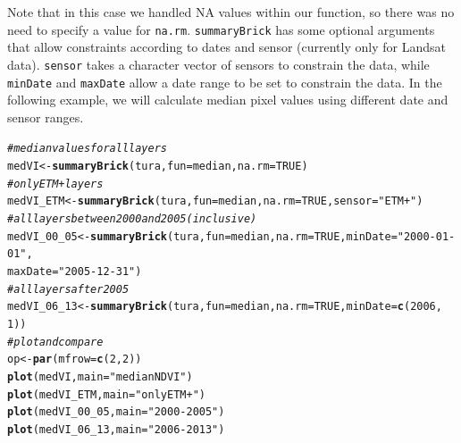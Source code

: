 \documentclass{article}\usepackage[]{graphicx}\usepackage[]{color}
\makeatletter
\newcommand{\hlnum}[1]{\textcolor[rgb]{0.686,0.059,0.569}{#1}}%
\newcommand{\hlstr}[1]{\textcolor[rgb]{0.192,0.494,0.8}{#1}}%
\newcommand{\hlcom}[1]{\textcolor[rgb]{0.678,0.584,0.686}{\textit{#1}}}%
\newcommand{\hlstd}[1]{\textcolor[rgb]{0.345,0.345,0.345}{#1}}%
\newcommand{\hlkwb}[1]{\textcolor[rgb]{0.69,0.353,0.396}{#1}}%
\newcommand{\hlkwc}[1]{\textcolor[rgb]{0.333,0.667,0.333}{#1}}%
\newcommand{\hlkwd}[1]{\textcolor[rgb]{0.737,0.353,0.396}{\textbf{#1}}}%
\newenvironment{kframe}{%
 \def\at@end@of@kframe{}%
 \ifinner\ifhmode%
  \def\at@end@of@kframe{\end{minipage}}%
  \begin{minipage}{\columnwidth}%
 \fi\fi%
 \def\FrameCommand##1{\hskip\@totalleftmargin \hskip-\fboxsep
 \colorbox{shadecolor}{##1}\hskip-\fboxsep
     \hskip-\linewidth \hskip-\@totalleftmargin \hskip\columnwidth}%
 \MakeFramed {\advance\hsize-\width
   \@totalleftmargin\z@ \linewidth\hsize
   \@setminipage}}%
 {\par\unskip\endMakeFramed%
 \at@end@of@kframe}
\newenvironment{knitrout}{}{} %
\def\code#1{\texttt{#1}}
\makeatother
\begin{document}
Note that in this case we handled NA values within our function, so there was no need to specify a value for \code{na.rm}. \code{summaryBrick} has some optional arguments that allow constraints according to dates and sensor (currently only for Landsat data). \code{sensor} takes a character vector of sensors to constrain the data, while \code{minDate} and \code{maxDate} allow a date range to be set to constrain the data. In the following example, we will calculate median pixel values using different date and sensor ranges.

\begin{knitrout}
\color{fgcolor}\begin{kframe}
\begin{alltt}
\hlcom{# median values for all layers}
\hlstd{medVI} \hlkwb{<-} \hlkwd{summaryBrick}\hlstd{(tura,} \hlkwc{fun} \hlstd{= median,} \hlkwc{na.rm} \hlstd{=} \hlnum{TRUE}\hlstd{)}
\hlcom{# only ETM+ layers}
\hlstd{medVI_ETM} \hlkwb{<-} \hlkwd{summaryBrick}\hlstd{(tura,} \hlkwc{fun} \hlstd{= median,} \hlkwc{na.rm} \hlstd{=} \hlnum{TRUE}\hlstd{,} \hlkwc{sensor} \hlstd{=} \hlstr{"ETM+"}\hlstd{)}
\hlcom{# all layers between 2000 and 2005 (inclusive)}
\hlstd{medVI_00_05} \hlkwb{<-} \hlkwd{summaryBrick}\hlstd{(tura,} \hlkwc{fun} \hlstd{= median,} \hlkwc{na.rm} \hlstd{=} \hlnum{TRUE}\hlstd{,} \hlkwc{minDate} \hlstd{=} \hlstr{"2000-01-01"}\hlstd{,}
    \hlkwc{maxDate} \hlstd{=} \hlstr{"2005-12-31"}\hlstd{)}
\hlcom{# all layers after 2005}
\hlstd{medVI_06_13} \hlkwb{<-} \hlkwd{summaryBrick}\hlstd{(tura,} \hlkwc{fun} \hlstd{= median,} \hlkwc{na.rm} \hlstd{=} \hlnum{TRUE}\hlstd{,} \hlkwc{minDate} \hlstd{=} \hlkwd{c}\hlstd{(}\hlnum{2006}\hlstd{,}
    \hlnum{1}\hlstd{))}
\hlcom{# plot and compare}
\hlstd{op} \hlkwb{<-} \hlkwd{par}\hlstd{(}\hlkwc{mfrow} \hlstd{=} \hlkwd{c}\hlstd{(}\hlnum{2}\hlstd{,} \hlnum{2}\hlstd{))}
\hlkwd{plot}\hlstd{(medVI,} \hlkwc{main} \hlstd{=} \hlstr{"median NDVI"}\hlstd{)}
\hlkwd{plot}\hlstd{(medVI_ETM,} \hlkwc{main} \hlstd{=} \hlstr{"only ETM+"}\hlstd{)}
\hlkwd{plot}\hlstd{(medVI_00_05,} \hlkwc{main} \hlstd{=} \hlstr{"2000-2005"}\hlstd{)}
\hlkwd{plot}\hlstd{(medVI_06_13,} \hlkwc{main} \hlstd{=} \hlstr{"2006-2013"}\hlstd{)}
\end{alltt}
\end{kframe}

\end{knitrout}
\end{document}
